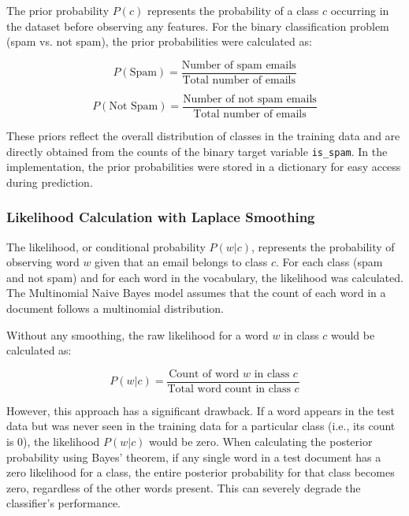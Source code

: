 \documentclass[12pt,letterpaper]{article}
\begin{document}
The prior probability $P(c)$ represents the probability of a class $c$ occurring in the dataset before observing any features. For the binary classification problem (spam vs. not spam), the prior probabilities were calculated as:

\begin{equation}
P(\text{Spam}) = \frac{\text{Number of spam emails}}{\text{Total number of emails}}
\end{equation}

\begin{equation}
P(\text{Not Spam}) = \frac{\text{Number of not spam emails}}{\text{Total number of emails}}
\end{equation}

These priors reflect the overall distribution of classes in the training data and are directly obtained from the counts of the binary target variable \texttt{is\_spam}. In the implementation, the prior probabilities were stored in a dictionary for easy access during prediction.

\subsubsection{Likelihood Calculation with Laplace Smoothing}

The likelihood, or conditional probability $P(w | c)$, represents the probability of observing word $w$ given that an email belongs to class $c$. For each class (spam and not spam) and for each word in the vocabulary, the likelihood was calculated. The Multinomial Naive Bayes model assumes that the count of each word in a document follows a multinomial distribution.

Without any smoothing, the raw likelihood for a word $w$ in class $c$ would be calculated as:

\begin{equation}
P(w | c) = \frac{\text{Count of word } w \text{ in class } c}{\text{Total word count in class } c}
\end{equation}

However, this approach has a significant drawback. If a word appears in the test data but was never seen in the training data for a particular class (i.e., its count is 0), the likelihood $P(w | c)$ would be zero. When calculating the posterior probability using Bayes' theorem, if any single word in a test document has a zero likelihood for a class, the entire posterior probability for that class becomes zero, regardless of the other words present. This can severely degrade the classifier's performance.
\end{document}
